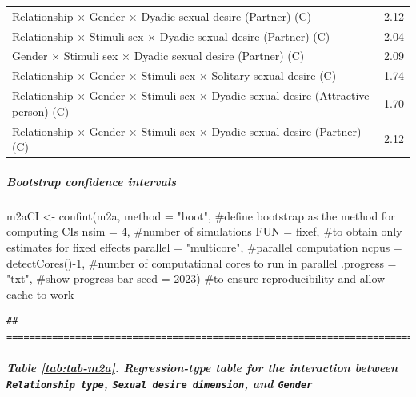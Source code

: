 \documentclass[
  bookmarksnumbered]{article}
\newenvironment{Shaded}{\begin{snugshade}}{\end{snugshade}}
\newcommand{\AttributeTok}[1]{\textcolor[rgb]{0.80,0.80,0.80}{#1}}
\newcommand{\CommentTok}[1]{\textcolor[rgb]{0.50,0.62,0.50}{#1}}
\newcommand{\DecValTok}[1]{\textcolor[rgb]{0.86,0.86,0.80}{#1}}
\newcommand{\FunctionTok}[1]{\textcolor[rgb]{0.94,0.94,0.56}{#1}}
\newcommand{\NormalTok}[1]{\textcolor[rgb]{0.80,0.80,0.80}{#1}}
\newcommand{\OtherTok}[1]{\textcolor[rgb]{0.94,0.94,0.56}{#1}}
\newcommand{\SpecialCharTok}[1]{\textcolor[rgb]{0.86,0.64,0.64}{#1}}
\newcommand{\StringTok}[1]{\textcolor[rgb]{0.80,0.58,0.58}{#1}}
\begin{document}
\begin{table}[H]
\begin{tabular}[t]{lc}
Relationship × Gender × Dyadic sexual desire (Partner) (C) & 2.12\\
Relationship × Stimuli sex × Dyadic sexual desire (Partner) (C) & 2.04\\
Gender × Stimuli sex × Dyadic sexual desire (Partner) (C) & 2.09\\
Relationship × Gender × Stimuli sex × Solitary sexual desire (C) & 1.74\\
Relationship × Gender × Stimuli sex × Dyadic sexual desire (Attractive person) (C) & 1.70\\
Relationship × Gender × Stimuli sex × Dyadic sexual desire (Partner) (C) & 2.12\\
\bottomrule
\end{tabular}
\end{table}

\hypertarget{bootstrap-confidence-intervals}{%
\subparagraph{Bootstrap confidence intervals}\label{bootstrap-confidence-intervals}}

\begin{Shaded}
\begin{Highlighting}[]
\NormalTok{m2aCI }\OtherTok{\textless{}{-}} \FunctionTok{confint}\NormalTok{(m2a, }
                 \AttributeTok{method =} \StringTok{"boot"}\NormalTok{, }\CommentTok{\#define bootstrap as the method for computing CIs}
                 \AttributeTok{nsim =} \DecValTok{4}\NormalTok{, }\CommentTok{\#number of simulations}
                 \AttributeTok{FUN =}\NormalTok{ fixef, }\CommentTok{\#to obtain only estimates for fixed effects}
                 \AttributeTok{parallel =} \StringTok{"multicore"}\NormalTok{, }\CommentTok{\#parallel computation}
                 \AttributeTok{ncpus =} \FunctionTok{detectCores}\NormalTok{()}\SpecialCharTok{{-}}\DecValTok{1}\NormalTok{, }\CommentTok{\#number of computational cores to run in parallel}
                 \AttributeTok{.progress =} \StringTok{"txt"}\NormalTok{, }\CommentTok{\#show progress bar}
                 \AttributeTok{seed =} \DecValTok{2023}\NormalTok{) }\CommentTok{\#to ensure reproducibility and allow cache to work}
\end{Highlighting}
\end{Shaded}

\begin{verbatim}
## ================================================================================
\end{verbatim}

\hypertarget{table-reftabtab-m2a.-regression-type-table-for-the-interaction-between-relationship-type-sexual-desire-dimension-and-gender}{%
\subparagraph{\texorpdfstring{Table \ref{tab:tab-m2a}. Regression-type table for the interaction between \texttt{Relationship\ type}, \texttt{Sexual\ desire\ dimension}, and \texttt{Gender}}{Table \ref{tab:tab-m2a}. Regression-type table for the interaction between Relationship type, Sexual desire dimension, and Gender}}\label{table-reftabtab-m2a.-regression-type-table-for-the-interaction-between-relationship-type-sexual-desire-dimension-and-gender}}
\end{document}
